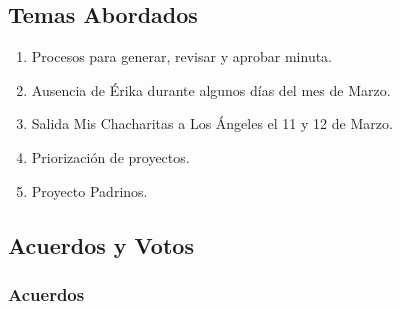 \documentclass[]{book}
\providecommand{\tightlist}{%
  \setlength{\itemsep}{0pt}\setlength{\parskip}{0pt}}
\begin{document}
\subsection{Temas Abordados}\label{temas-abordados-2}

\begin{enumerate}
\def\labelenumi{\arabic{enumi}.}
\tightlist
\item
  Procesos para generar, revisar y aprobar minuta.
\item
  Ausencia de Érika durante algunos días del mes de Marzo.
\item
  Salida Mis Chacharitas a Los Ángeles el 11 y 12 de Marzo.
\item
  Priorización de proyectos.
\item
  Proyecto Padrinos.
\end{enumerate}

\subsection{Acuerdos y Votos}\label{acuerdos-y-votos-2}

\subsubsection{Acuerdos}\label{acuerdos-2}
\end{document}
